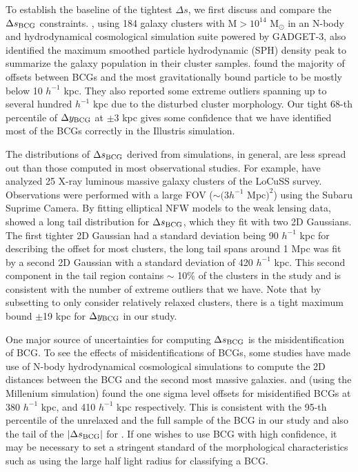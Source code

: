 To establish the baseline of the tightest $\Delta s$, we first discuss and 
compare the $\Delta s_{\rm BCG}$ constraints.   
\cite{Cui2015}, using 184 galaxy clusters with M$ > 10^{14}$ M$_\odot$ in an
N-body and hydrodynamical cosmological simulation suite powered by GADGET-3, 
also identified the maximum smoothed particle hydrodynamic (SPH) density peak
to summarize 
the galaxy population in their cluster samples. \cite{Cui2015} found
the majority of offsets between BCGs and the most gravitationally bound particle to be
mostly below 10 $h^{-1}$ kpc. They also reported some extreme outliers 
spanning up to several hundred $h^{-1}$ kpc due to the disturbed cluster morphology. Our 
tight 68-th percentile of 
$\Delta y_{\rm BCG}$ at $ \pm 3$ kpc gives some confidence that 
we have identified most of the BCGs correctly in the Illustris simulation.

The distributions of $\Delta s_{\rm BCG}$ derived from simulations, in general, 
are less spread out than those computed in most observational studies.
For example, \cite{Oguri2010} have analyzed 25 X-ray luminous 
massive galaxy clusters of the LoCuSS survey. 
Observations were performed with a large FOV ($\sim (3 h^{-1}$ Mpc$)^2$) 
using the Subaru Suprime Camera. 
By fitting elliptical NFW models to the weak lensing data, \cite{Oguri2010}
showed a long tail
 distribution for $\Delta s_{\rm BCG}$, which they fit with two 2D Gaussians.
The first tighter 2D Gaussian had a standard deviation being 90
$h^{-1}$ kpc for describing the
offset for most clusters, the long tail spans around 1 Mpc was fit by a second 2D
Gaussian with a standard deviation of 420 $h^{-1}$ kpc. This second component
in the tail region contains $\sim$ 10\% of the clusters in the study and is
consistent with the number of extreme outliers that we have.   
Note that by subsetting to only consider relatively relaxed clusters, 
there is a tight maximum bound $\pm$19 kpc for $\Delta y_{\rm BCG}$ in our study. 

One major source of uncertainties for computing $\Delta s_{\rm BCG}$ is the
misidentification of BCG.
To see the effects of misidentifications of 
BCGs, some studies have made use of N-body hydrodynamical cosmological
simulations to compute the 2D distances between the BCG and 
the second most massive galaxies. \cite{Johnston2007b} and 
\cite{Hilbert2010} (using the Millenium simulation)  found 
the one sigma level offsets for misidentified BCGs at 380 $h^{-1}$ kpc, and 410 
$h^{-1}$ kpc respectively. This is consistent with the 95-th percentile of the
unrelaxed and the full sample of the BCG in our study and also the tail of the
$|\Delta s_{\rm BCG}|$ for \cite{Cui2015}. If one wishes to use BCG with high
confidence, it may be necessary to set a stringent standard of the morphological
characteristics such as using the large half light radius for classifying a BCG.

